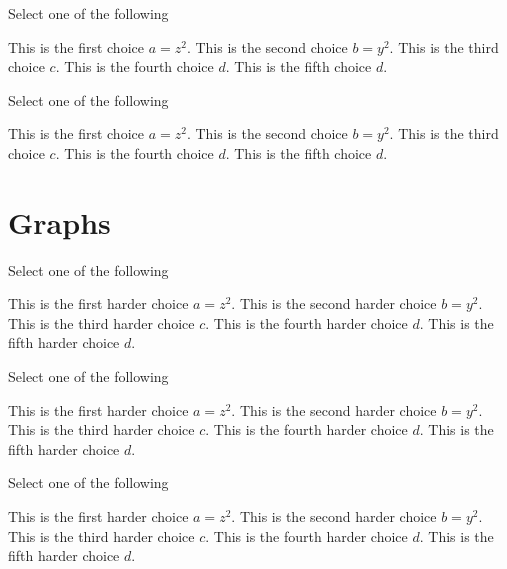 \begin{problem}[90][Xchoice II]
Select one of the following
\begin{xchoice}
\choice This is the first choice $a = z^2$.
\choice This is the second choice $b = y^2$.
\choice* This is the third choice $c$.
\choice* This is the fourth choice $d$.
\choice This is the fifth choice $d$.
\end{xchoice}
\end{problem}

\begin{problem}
Select one of the following
\begin{xchoice}
\choice This is the first choice $a = z^2$.
\choice This is the second choice $b = y^2$.
\choice* This is the third choice $c$.
\choice* This is the fourth choice $d$.
\choice This is the fifth choice $d$.
\end{xchoice}
\end{problem}


\newpage
\section{Graphs}

\begin{problem}
Select one of the following
\begin{xchoice}
\choice This is the first harder choice $a = z^2$.
\choice This is the second harder choice $b = y^2$.
\choice* This is the third harder choice $c$.
\choice* This is the fourth harder choice $d$.
\choice This is the fifth harder choice $d$.
\end{xchoice}
\end{problem}


\begin{problem}
Select one of the following
\begin{xchoice}
\choice This is the first harder choice $a = z^2$.
\choice This is the second harder choice $b = y^2$.
\choice* This is the third harder choice $c$.
\choice* This is the fourth harder choice $d$.
\choice This is the fifth harder choice $d$.
\end{xchoice}
\end{problem}

\begin{problem}
Select one of the following
\begin{xchoice}
\choice This is the first harder choice $a = z^2$.
\choice This is the second harder choice $b = y^2$.
\choice* This is the third harder choice $c$.
\choice* This is the fourth harder choice $d$.
\choice This is the fifth harder choice $d$.
\end{xchoice}
\end{problem}



